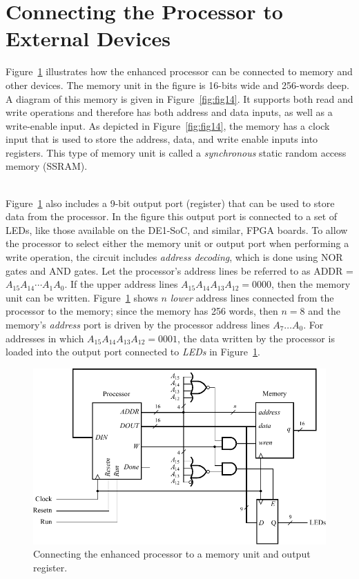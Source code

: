 \documentclass[epsfig,10pt,fullpage]{article} \addtolength{\textwidth}{1.5in}
\begin{document}
\section*{Connecting the Processor to External Devices}

Figure~\ref{fig:fig13} illustrates how the enhanced processor can be connected to memory and 
other devices. The memory unit in the figure is 16-bits wide and 256-words deep.  A diagram 
of this memory is given in Figure~\ref{fig:fig14}.
It supports both read and write operations and therefore has both address and 
data inputs, as well as a write-enable input. As depicted in Figure~\ref{fig:fig14},
the memory has a clock input that is used to store the address, data, and write enable 
inputs into registers.  This type of memory unit is called a {\it synchronous}
static random access memory (SSRAM). 

~\\
Figure~\ref{fig:fig13} also includes a 9-bit output port (register) that can be used to store 
data from the processor. In the figure this output port is connected to a set of LEDs, like 
those available on the DE1-SoC, and similar, FPGA boards. To allow the processor to select 
either the memory 
unit or output port when performing a write operation, the circuit includes {\it address decoding},
which is done using NOR gates and AND gates. Let the processor's address lines be referred
to as ADDR = $A_{15} A_{14} \cdots A_1 A_0$. 
If the upper address lines $A_{15} A_{14} A_{13} A_{12} = 0000$, then the memory unit 
can be written. Figure~\ref{fig:fig13} shows $n$ {\it lower} address lines connected from the 
processor to the memory; since the memory has 256 words, then $n = 8$ and the memory's 
{\it address} port is driven by the processor address lines $A_7 \ldots A_0$. For
addresses in which $A_{15} A_{14} A_{13} A_{12} = 0001$, the data written by the processor
is loaded into the output port connected to {\it LEDs} in Figure~\ref{fig:fig13}.
~\\
\begin{figure}[H]
\begin{center}
\includegraphics{figures/figure13.pdf}
\end{center}
\vspace{-0.5cm}
\caption{Connecting the enhanced processor to a memory unit and output register.}
\label{fig:fig13}
\end{figure}
\end{document}
